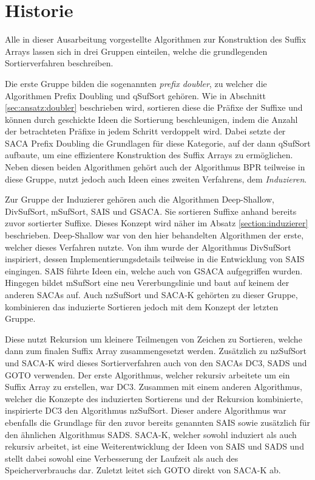 \section{Historie}
Alle  in dieser Ausarbeitung vorgestellte Algorithmen zur Konstruktion des Suffix Arrays lassen sich in drei Gruppen einteilen, welche die grundlegenden Sortierverfahren beschreiben. \par
Die erste Gruppe bilden die sogenannten \textit{prefix doubler}, zu welcher die Algorithmen Prefix Doubling und qSufSort gehören.
Wie in Abschnitt \ref{sec:ansatz:doubler} beschrieben wird, sortieren diese die Präfixe der Suffixe und können durch geschickte Ideen die Sortierung beschleunigen, indem die Anzahl der betrachteten Präfixe in jedem Schritt verdoppelt wird. 
Dabei setzte der SACA Prefix Doubling die Grundlagen für diese Kategorie, auf der dann qSufSort aufbaute, um eine effizientere Konstruktion des Suffix Arrays zu ermöglichen. 
Neben diesen beiden Algorithmen gehört auch der Algorithmus BPR teilweise in diese Gruppe, nutzt jedoch auch Ideen eines zweiten Verfahrens, dem \textit{Induzieren}. \par

Zur Gruppe der Induzierer gehören auch die Algorithmen Deep-Shallow, DivSufSort, mSufSort, SAIS und GSACA.
Sie sortieren Suffixe anhand bereits zuvor sortierter Suffixe.
Dieses Konzept wird näher im Absatz \ref{section:induzierer} beschrieben.
Deep-Shallow war von den hier behandelten Algorithmen der erste, welcher dieses Verfahren nutzte.
Von ihm wurde der Algorithmus DivSufSort inspiriert, dessen Implementierungsdetails teilweise in die Entwicklung von SAIS eingingen.
SAIS führte Ideen ein, welche auch von GSACA aufgegriffen wurden.
Hingegen bildet mSufSort eine neu Vererbungslinie und baut auf keinem der anderen SACAs auf.
Auch nzSufSort und SACA-K gehörten zu dieser Gruppe, kombinieren das induzierte Sortieren jedoch mit dem Konzept der letzten Gruppe. \par

Diese nutzt Rekursion um kleinere Teilmengen von Zeichen zu Sortieren, welche dann zum finalen Suffix Array zusammengesetzt werden.
Zusätzlich zu nzSufSort und SACA-K wird dieses Sortierverfahren auch von den SACAs DC3, SADS und GOTO verwenden. 
Der erste Algorithmus, welcher rekursiv arbeitete um ein Suffix Array zu erstellen, war DC3. 
Zusammen mit einem anderen Algorithmus, welcher die Konzepte des induzierten Sortierens und der Rekursion kombinierte, inspirierte DC3 den Algorithmus nzSufSort. 
Dieser andere Algorithmus war ebenfalls die Grundlage für den zuvor bereits genannten SAIS sowie zusätzlich für den ähnlichen Algorithmus SADS.
SACA-K, welcher sowohl induziert als auch rekursiv arbeitet, ist eine Weiterentwicklung der Ideen von SAIS und SADS und stellt dabei sowohl eine Verbesserung der Laufzeit als auch des Speicherverbrauchs dar.
Zuletzt leitet sich GOTO direkt von SACA-K ab. \par

